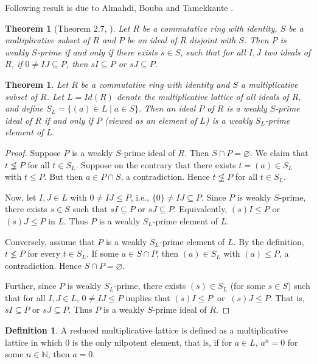 \documentclass[10pt,twoside,a4paper]{amsart}
\numberwithin{equation}{section}
\theoremstyle{plain}
\newtheorem{thm}[lem]{Theorem}
\theoremstyle{definition}
\newtheorem{definition}[lem]{Definition}
\begin{document}
Following result is due to Almahdi, Bouba and Tamekkante \cite{ABT}.

\begin{thm}[Theorem 2.7, \cite{ABT}] %
	Let $R$ be a commutative ring with identity, $S $ be a multiplicative subset of $R$ and $P$ be an ideal of $R$ disjoint with $S$. Then $P$ is weakly $S$-prime if and only if there exists $s \in S$, such that for all $I, J$ two ideals of $R$, if $0\neq IJ \subseteq P$, then $sI \subseteq P$ or $sJ \subseteq P$.
\end{thm}

\begin{thm}%
	Let $R$ be a commutative ring with identity and $S$ a multiplicative subset of $R$. 
	Let $L=Id(R)$ denote the multiplicative lattice of all ideals of $R$, and define 
	$S_L=\{(a)\in L \mid a\in S\}.$
	Then an ideal $P$ of $R$ is a weakly $S$-prime ideal of $R$ if and only if $P$ (viewed as an element of $L$) is a weakly $S_L$-prime element of $L$.
\end{thm}

\begin{proof}
	Suppose $P$ is a weakly $S$-prime ideal of $R$. Then $S\cap P=\varnothing$.  We claim that $t\not\leqq P$ for all $t\in S_L$. Suppose on the contrary that  there exists $t=(a)\in S_L$ with $t\le P$. But then $a\in P\cap S$, a contradiction.  
	Hence $t\not\leqq P$ for all $t\in S_L$.  
	
	Now, let $ I,J\in L$ with $0\neq IJ \leq P$, i.e., $\{0\}\neq IJ\subseteq P$. Since $P$ is weakly $S$-prime, there exists $s\in S$ such that $sI\subseteq P$ or $sJ\subseteq P$.  
	Equivalently, $(s)I\leq  P$ or $(s)J\leq P$ in $L$.  
	Thus $P$ is a weakly $S_L$-prime element of $L$.
	
	Conversely, assume that $P$ is a weakly $S_L$-prime element of $L$.  
	By the definition, $t\not\leq P$ for every $t\in S_L$. If some $a\in S\cap P$, then $(a)\in S_L$ with $(a)\le P$, a contradiction. Hence $S\cap P=\varnothing$.  
	
	Further, since $P$ is weakly $S_L$-prime, there exists $(s)\in S_L$ (for some $s\in S$) such that for all $I,J\in L$,
	$0\neq IJ\leq  P$ implies that $ (s)I\leq P \ \text{ or }\ (s)J\leq P$.
	That is, $sI\subseteq P$ or $sJ\subseteq P$. Thus $P$ is a weakly $S$-prime ideal of $R$.
\end{proof}

\begin{definition}\cite{JS} 
	A reduced multiplicative lattice is defined as a multiplicative lattice in which 0 is the only nilpotent element, that is, if for $a\in L$, $a^n=0$ for some $n\in \mathbb{N}$, then $a=0$.
\end{definition}
\end{document}
